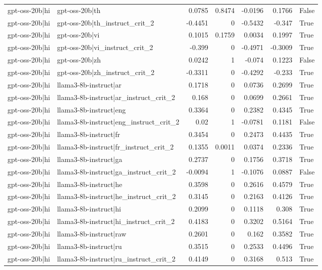 \begin{table}
\begin{tabular}{l l r r r r l}
gpt-oss-20b|hi & gpt-oss-20b|th & 0.0785 & 0.8474 & -0.0196 & 0.1766 & False \\
gpt-oss-20b|hi & gpt-oss-20b|th_instruct_crit_2 & -0.4451 & 0 & -0.5432 & -0.347 & True \\
gpt-oss-20b|hi & gpt-oss-20b|vi & 0.1015 & 0.1759 & 0.0034 & 0.1997 & True \\
gpt-oss-20b|hi & gpt-oss-20b|vi_instruct_crit_2 & -0.399 & 0 & -0.4971 & -0.3009 & True \\
gpt-oss-20b|hi & gpt-oss-20b|zh & 0.0242 & 1 & -0.074 & 0.1223 & False \\
gpt-oss-20b|hi & gpt-oss-20b|zh_instruct_crit_2 & -0.3311 & 0 & -0.4292 & -0.233 & True \\
gpt-oss-20b|hi & llama3-8b-instruct|ar & 0.1718 & 0 & 0.0736 & 0.2699 & True \\
gpt-oss-20b|hi & llama3-8b-instruct|ar_instruct_crit_2 & 0.168 & 0 & 0.0699 & 0.2661 & True \\
gpt-oss-20b|hi & llama3-8b-instruct|eng & 0.3364 & 0 & 0.2382 & 0.4345 & True \\
gpt-oss-20b|hi & llama3-8b-instruct|eng_instruct_crit_2 & 0.02 & 1 & -0.0781 & 0.1181 & False \\
gpt-oss-20b|hi & llama3-8b-instruct|fr & 0.3454 & 0 & 0.2473 & 0.4435 & True \\
gpt-oss-20b|hi & llama3-8b-instruct|fr_instruct_crit_2 & 0.1355 & 0.0011 & 0.0374 & 0.2336 & True \\
gpt-oss-20b|hi & llama3-8b-instruct|ga & 0.2737 & 0 & 0.1756 & 0.3718 & True \\
gpt-oss-20b|hi & llama3-8b-instruct|ga_instruct_crit_2 & -0.0094 & 1 & -0.1076 & 0.0887 & False \\
gpt-oss-20b|hi & llama3-8b-instruct|he & 0.3598 & 0 & 0.2616 & 0.4579 & True \\
gpt-oss-20b|hi & llama3-8b-instruct|he_instruct_crit_2 & 0.3145 & 0 & 0.2163 & 0.4126 & True \\
gpt-oss-20b|hi & llama3-8b-instruct|hi & 0.2099 & 0 & 0.1118 & 0.308 & True \\
gpt-oss-20b|hi & llama3-8b-instruct|hi_instruct_crit_2 & 0.4183 & 0 & 0.3202 & 0.5164 & True \\
gpt-oss-20b|hi & llama3-8b-instruct|raw & 0.2601 & 0 & 0.162 & 0.3582 & True \\
gpt-oss-20b|hi & llama3-8b-instruct|ru & 0.3515 & 0 & 0.2533 & 0.4496 & True \\
gpt-oss-20b|hi & llama3-8b-instruct|ru_instruct_crit_2 & 0.4149 & 0 & 0.3168 & 0.513 & True \\

\end{tabular}
\end{table}
